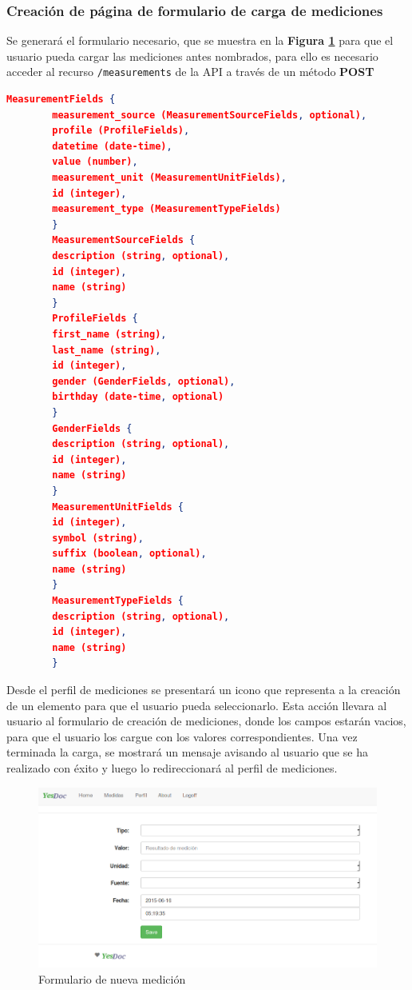 \documentclass[a4paper,12pt]{article}
\begin{document}
\subsubsection{ Creación de página de formulario de carga de mediciones}
Se generará el formulario necesario, que se muestra en la \textbf{Figura \ref{nueva_medicion}} para que el usuario pueda cargar las mediciones antes nombrados, para ello es necesario acceder al recurso \texttt{/measurements} de la API a través de un método \textbf{POST}

      \begin{lstlisting}[language=json,firstnumber=1]
         MeasurementFields {
        measurement_source (MeasurementSourceFields, optional),
        profile (ProfileFields),
        datetime (date-time),
        value (number),
        measurement_unit (MeasurementUnitFields),
        id (integer),
        measurement_type (MeasurementTypeFields)
        }
        MeasurementSourceFields {
        description (string, optional),
        id (integer),
        name (string)
        }
        ProfileFields {
        first_name (string),
        last_name (string),
        id (integer),
        gender (GenderFields, optional),
        birthday (date-time, optional)
        }
        GenderFields {
        description (string, optional),
        id (integer),
        name (string)
        }
        MeasurementUnitFields {
        id (integer),
        symbol (string),
        suffix (boolean, optional),
        name (string)
        }
        MeasurementTypeFields {
        description (string, optional),
        id (integer),
        name (string)
        } 
    \end{lstlisting}
    
Desde el perfil de mediciones se presentará un icono que representa a la creación de un elemento para que el usuario pueda seleccionarlo. Esta acción llevara al usuario al formulario de creación de mediciones, donde los campos estarán vacios, para que el usuario los cargue con los valores correspondientes. Una vez terminada la carga, se mostrará un mensaje avisando al usuario que se ha realizado con éxito y luego lo redireccionará al perfil de mediciones.
    
    \begin{figure}[h]
        \centering
        \includegraphics[width=1\textwidth]{img/2-nueva_medicion}
        \caption{Formulario de nueva medición}
		\label{nueva_medicion}
    \end{figure}
\end{document}
